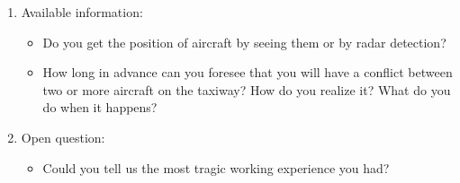 \documentclass{article}
\begin{document}
\begin{enumerate}
    \item Available information:
        \begin{itemize}
            \item Do you get the position of aircraft by seeing them or by radar detection?
            \item How long in advance can you foresee that you will have a conflict between two or more aircraft on the taxiway? How do you realize it? What do you do when it happens?
        \end{itemize}
    \item Open question:
    \begin{itemize}
        \item Could you tell us the most tragic working experience you had?
    \end{itemize}
    
\end{enumerate}
\end{document}
